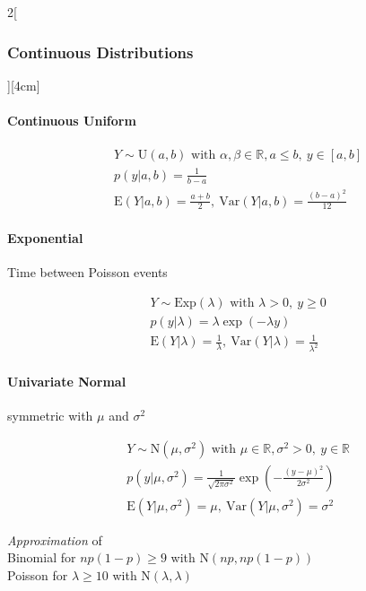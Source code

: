 \documentclass[8pt]{extarticle}
\begin{document}
\begin{multicols}{2}[\subsubsection{Continuous Distributions}][4cm]

	\paragraph{Continuous Uniform}
  
    \begin{align*}
    & Y \sim \mathrm{U}(a,b) \text{ with } \alpha, \beta \in \mathbb{R}, a \le b,\: y \in \left[a,b\right] \\
    & p(y|a,b) =\frac{1}{b-a} \\
    & \mathrm{E}(Y|a,b) = \frac{a+b}{2} ,\: \mathrm{Var}(Y|a,b) = \frac{(b-a)^2}{12}
  \end{align*}
  
    	\paragraph{Exponential} Time between Poisson events
  
    \begin{align*}
    & Y \sim \mathrm{Exp}(\lambda) \text{ with } \lambda > 0,\: y \geq 0\\
    & p(y|\lambda) = \lambda\exp (-\lambda y) \\
    & \mathrm{E}(Y|\lambda) = \frac{1}{\lambda}, \:
	\mathrm{Var}(Y|\lambda) = \frac{1}{\lambda^2}
  \end{align*}
  
    \paragraph{Univariate Normal} symmetric with $\mu$ and $\sigma^2$
  
    \begin{align*}
    & Y \sim \mathrm{N}(\mu, \sigma^2) \text{ with } \mu \in \mathbb{R}, \sigma^2 > 0,\: y \in \mathbb{R} \\
    & p(y|\mu, \sigma^2) =\frac{1}{\sqrt{2\pi\sigma^2}} \exp \left(-\frac{(y-\mu)^2}{2 \sigma^2} \right) \\
    & \mathrm{E}(Y|\mu, \sigma^2) = \mu ,\: \mathrm{Var}(Y|\mu, \sigma^2) = \sigma^2
  \end{align*}
  
  \noindent   \textit{Approximation} of \\ Binomial for $np(1{-}p)\geq 9$ with $\mathrm{N}(np,np(1{-}p))$ \\
  Poisson for $\lambda \geq 10$ with $\mathrm{N}(\lambda,\lambda)$
  

\end{multicols}
\end{document}
